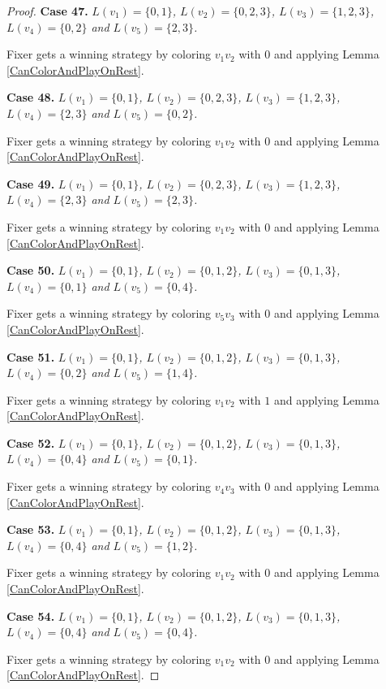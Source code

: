 \documentclass[12pt]{amsart}
\theoremstyle{plain}
\theoremstyle{definition}
\theoremstyle{remark}
\begin{document}
\begin{proof}
\noindent\textbf{Case 47.  }\textit{$L(v_1) = \{0, 1\}$, $L(v_2) = \{0, 2, 3\}$, $L(v_3) = \{1, 2, 3\}$, $L(v_4) = \{0, 2\}$ and $L(v_5) = \{2, 3\}$.}

Fixer gets a winning strategy by coloring $v_1v_2$ with $0$ and applying Lemma \ref{CanColorAndPlayOnRest}.

\noindent\textbf{Case 48.  }\textit{$L(v_1) = \{0, 1\}$, $L(v_2) = \{0, 2, 3\}$, $L(v_3) = \{1, 2, 3\}$, $L(v_4) = \{2, 3\}$ and $L(v_5) = \{0, 2\}$.}

Fixer gets a winning strategy by coloring $v_1v_2$ with $0$ and applying Lemma \ref{CanColorAndPlayOnRest}.

\noindent\textbf{Case 49.  }\textit{$L(v_1) = \{0, 1\}$, $L(v_2) = \{0, 2, 3\}$, $L(v_3) = \{1, 2, 3\}$, $L(v_4) = \{2, 3\}$ and $L(v_5) = \{2, 3\}$.}

Fixer gets a winning strategy by coloring $v_1v_2$ with $0$ and applying Lemma \ref{CanColorAndPlayOnRest}.

\noindent\textbf{Case 50.  }\textit{$L(v_1) = \{0, 1\}$, $L(v_2) = \{0, 1, 2\}$, $L(v_3) = \{0, 1, 3\}$, $L(v_4) = \{0, 1\}$ and $L(v_5) = \{0, 4\}$.}

Fixer gets a winning strategy by coloring $v_5v_3$ with $0$ and applying Lemma \ref{CanColorAndPlayOnRest}.

\noindent\textbf{Case 51.  }\textit{$L(v_1) = \{0, 1\}$, $L(v_2) = \{0, 1, 2\}$, $L(v_3) = \{0, 1, 3\}$, $L(v_4) = \{0, 2\}$ and $L(v_5) = \{1, 4\}$.}

Fixer gets a winning strategy by coloring $v_1v_2$ with $1$ and applying Lemma \ref{CanColorAndPlayOnRest}.

\noindent\textbf{Case 52.  }\textit{$L(v_1) = \{0, 1\}$, $L(v_2) = \{0, 1, 2\}$, $L(v_3) = \{0, 1, 3\}$, $L(v_4) = \{0, 4\}$ and $L(v_5) = \{0, 1\}$.}

Fixer gets a winning strategy by coloring $v_4v_3$ with $0$ and applying Lemma \ref{CanColorAndPlayOnRest}.

\noindent\textbf{Case 53.  }\textit{$L(v_1) = \{0, 1\}$, $L(v_2) = \{0, 1, 2\}$, $L(v_3) = \{0, 1, 3\}$, $L(v_4) = \{0, 4\}$ and $L(v_5) = \{1, 2\}$.}

Fixer gets a winning strategy by coloring $v_1v_2$ with $0$ and applying Lemma \ref{CanColorAndPlayOnRest}.

\noindent\textbf{Case 54.  }\textit{$L(v_1) = \{0, 1\}$, $L(v_2) = \{0, 1, 2\}$, $L(v_3) = \{0, 1, 3\}$, $L(v_4) = \{0, 4\}$ and $L(v_5) = \{0, 4\}$.}

Fixer gets a winning strategy by coloring $v_1v_2$ with $0$ and applying Lemma \ref{CanColorAndPlayOnRest}.


\end{proof}
\end{document}
